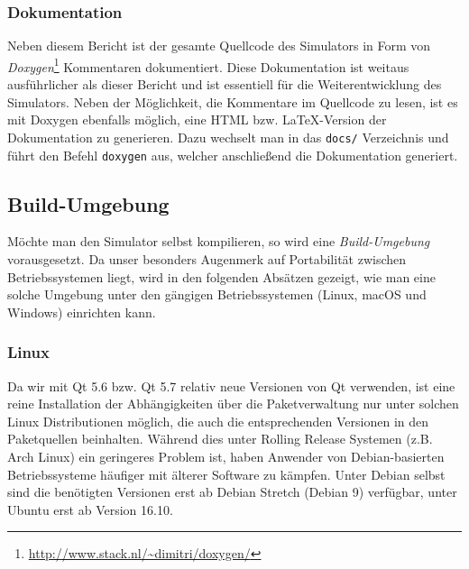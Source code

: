\subsubsection{Dokumentation}

Neben diesem Bericht ist der gesamte Quellcode des Simulators in Form von
\emph{Doxygen}\footnote{\url{http://www.stack.nl/~dimitri/doxygen/}} Kommentaren
dokumentiert. Diese Dokumentation ist weitaus ausführlicher als dieser Bericht
und ist essentiell für die Weiterentwicklung des Simulators. Neben der
Möglichkeit, die Kommentare im Quellcode zu lesen, ist es mit Doxygen ebenfalls
möglich, eine HTML bzw. \LaTeX -Version der Dokumentation zu generieren. Dazu
wechselt man in das \texttt{docs/} Verzeichnis und führt den Befehl
\texttt{doxygen} aus, welcher anschließend die Dokumentation generiert.

\subsection{Build-Umgebung}
\label{sec:build-env}

Möchte man den Simulator selbst kompilieren, so wird eine \emph{Build-Umgebung}
vorausgesetzt. Da unser besonders Augenmerk auf Portabilität zwischen
Betriebssystemen liegt, wird in den folgenden Absätzen gezeigt, wie man eine
solche Umgebung unter den gängigen Betriebssystemen (Linux, macOS und Windows)
einrichten kann.

\subsubsection{Linux}

Da wir mit Qt 5.6 bzw. Qt 5.7 relativ neue Versionen von Qt verwenden, ist eine
reine Installation der Abhängigkeiten über die Paketverwaltung nur unter solchen
Linux Distributionen möglich, die auch die entsprechenden Versionen in den
Paketquellen beinhalten. Während dies unter Rolling Release Systemen (z.B. Arch
Linux) ein geringeres Problem ist, haben Anwender von Debian-basierten
Betriebssysteme häufiger mit älterer Software zu kämpfen. Unter Debian selbst
sind die benötigten Versionen erst ab Debian Stretch (Debian 9) verfügbar, unter
Ubuntu erst ab Version 16.10.

